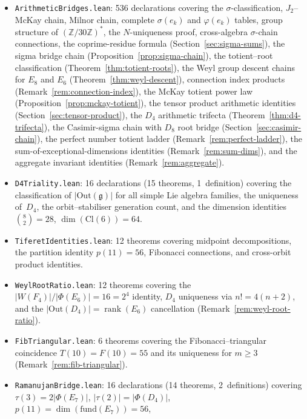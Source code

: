 \documentclass[11pt]{amsart}
\theoremstyle{plain}
\theoremstyle{definition}
\theoremstyle{remark}
\newcommand{\fg}{\mathfrak{g}}
\renewcommand{\Phi}{\varPhi}
\newcommand{\rank}{\operatorname{rank}}
\begin{document}
\begin{itemize}
  \item \texttt{ArithmeticBridges.lean}: 536 declarations covering the
    $\sigma$-classification, $J_2$--McKay chain, Milnor chain,
    complete $\sigma(e_k)$ and $\varphi(e_k)$ tables, group structure
    of $(\mathbb{Z}/30\mathbb{Z})^*$, the $N$-uniqueness proof,
    cross-algebra $\sigma$-chain connections, the coprime-residue
    formula (Section~\ref{sec:sigma-sums}), the sigma bridge chain
    (Proposition~\ref{prop:sigma-chain}), the totient--root
    classification (Theorem~\ref{thm:totient-roots}), the Weyl group
    descent chains for $E_8$ and $E_6$
    (Theorem~\ref{thm:weyl-descent}), connection index products
    (Remark~\ref{rem:connection-index}), the McKay totient power law
    (Proposition~\ref{prop:mckay-totient}), the tensor product
    arithmetic identities (Section~\ref{sec:tensor-product}), the
    $D_4$ arithmetic trifecta (Theorem~\ref{thm:d4-trifecta}), the
    Casimir-sigma chain with $D_8$ root bridge
    (Section~\ref{sec:casimir-chain}), the perfect number totient
    ladder (Remark~\ref{rem:perfect-ladder}), the
    sum-of-exceptional-dimensions identities
    (Remark~\ref{rem:sum-dims}), and the aggregate invariant
    identities (Remark~\ref{rem:aggregate}).
  \item \texttt{D4Triality.lean}: 16 declarations (15 theorems,
    1~definition) covering the classification of
    $|\mathrm{Out}(\fg)|$ for all simple Lie algebra families,
    the uniqueness of~$D_4$, the orbit--stabiliser generation count,
    and the dimension identities $\binom{8}{2} = 28$,
    $\dim(\mathrm{Cl}(6)) = 64$.
  \item \texttt{TiferetIdentities.lean}: 12 theorems covering midpoint
    decompositions, the partition identity $p(11)=56$, Fibonacci
    connections, and cross-orbit product identities.
  \item \texttt{WeylRootRatio.lean}: 12 theorems covering the
    $|W(F_4)|/|\Phi(E_6)| = 16 = 2^4$ identity, $D_4$ uniqueness via
    $n! = 4(n+2)$, and the $|\mathrm{Out}(D_4)| = \rank(E_6)$
    cancellation (Remark~\ref{rem:weyl-root-ratio}).
  \item \texttt{FibTriangular.lean}: 6 theorems covering the
    Fibonacci--triangular coincidence $T(10) = F(10) = 55$ and its
    uniqueness for $m \ge 3$ (Remark~\ref{rem:fib-triangular}).
  \item \texttt{RamanujanBridge.lean}: 16 declarations (14 theorems,
    2~definitions) covering $\tau(3) = 2|\Phi(E_7)|$,
    $|\tau(2)| = |\Phi(D_4)|$, $p(11) = \dim(\text{fund}(E_7)) = 56$,

\end{itemize}
\end{document}
